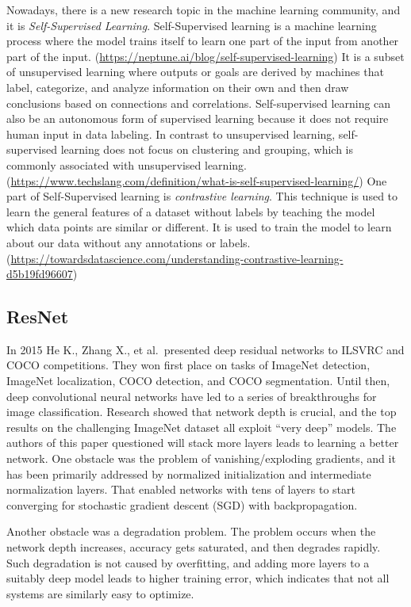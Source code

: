 \documentclass[
]{krantz}
\begin{document}
Nowadays, there is a new research topic in the machine learning community, and it is \emph{Self-Supervised Learning}. Self-Supervised learning is a machine learning process where the model trains itself to learn one part of the input from another part of the input. (\url{https://neptune.ai/blog/self-supervised-learning}) It is a subset of unsupervised learning where outputs or goals are derived by machines that label, categorize, and analyze information on their own and then draw conclusions based on connections and correlations. Self-supervised learning can also be an autonomous form of supervised learning because it does not require human input in data labeling. In contrast to unsupervised learning, self-supervised learning does not focus on clustering and grouping, which is commonly associated with unsupervised learning. (\url{https://www.techslang.com/definition/what-is-self-supervised-learning/})
One part of Self-Supervised learning is \emph{contrastive learning}. This technique is used to learn the general features of a dataset without labels by teaching the model which data points are similar or different. It is used to train the model to learn about our data without any annotations or labels. (\url{https://towardsdatascience.com/understanding-contrastive-learning-d5b19fd96607})

\hypertarget{resnet}{%
\subsection{ResNet}\label{resnet}}

In 2015 He K., Zhang X., et al.~presented deep residual networks to ILSVRC and COCO competitions. They won first place on tasks of ImageNet detection, ImageNet localization, COCO detection, and COCO segmentation. Until then, deep convolutional neural networks have led to a series of breakthroughs for image classification. Research showed that network depth is crucial, and the top results on the challenging ImageNet dataset all exploit ``very deep'' models. The authors of this paper questioned will stack more layers leads to learning a better network. One obstacle was the problem of vanishing/exploding gradients, and it has been primarily addressed by normalized initialization and intermediate normalization layers. That enabled networks with tens of layers to start converging for stochastic gradient descent (SGD) with backpropagation.

Another obstacle was a degradation problem. The problem occurs when the network depth increases, accuracy gets saturated, and then degrades rapidly. Such degradation is not caused by overfitting, and adding more layers to a suitably deep model leads to higher training error, which indicates that not all systems are similarly easy to optimize.
\end{document}
